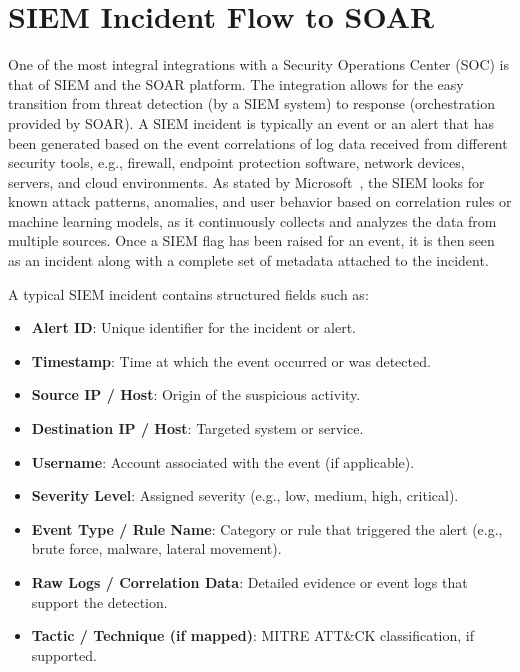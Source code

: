\section{SIEM Incident Flow to SOAR}

One of the most integral integrations with a Security Operations Center (SOC) is that of SIEM and the SOAR platform. The integration allows for the easy transition from threat detection (by a SIEM system) to response (orchestration provided by SOAR). A SIEM incident is typically an event or an alert that has been generated based on the event correlations of log data received from different security tools, e.g., firewall, endpoint protection software, network devices, servers, and cloud environments. As stated by Microsoft~\cite{microsoftsiem}, the SIEM looks for known attack patterns, anomalies, and user behavior based on correlation rules or machine learning models, as it continuously collects and analyzes the data from multiple sources. Once a SIEM flag has been raised for an event, it is then seen as an incident along with a complete set of metadata attached to the incident.

A typical SIEM incident contains structured fields such as:

\begin{itemize}[itemsep=0pt,parsep=0pt,topsep=0pt,partopsep=0pt]
    \item \textbf{Alert ID}: Unique identifier for the incident or alert.
    \item \textbf{Timestamp}: Time at which the event occurred or was detected.
    \item \textbf{Source IP / Host}: Origin of the suspicious activity.
    \item \textbf{Destination IP / Host}: Targeted system or service.
    \item \textbf{Username}: Account associated with the event (if applicable).
    \item \textbf{Severity Level}: Assigned severity (e.g., low, medium, high, critical).
    \item \textbf{Event Type / Rule Name}: Category or rule that triggered the alert (e.g., brute force, malware, lateral movement).
    \item \textbf{Raw Logs / Correlation Data}: Detailed evidence or event logs that support the detection.
    \item \textbf{Tactic / Technique (if mapped)}: MITRE ATT\&CK classification, if supported.
\end{itemize}

